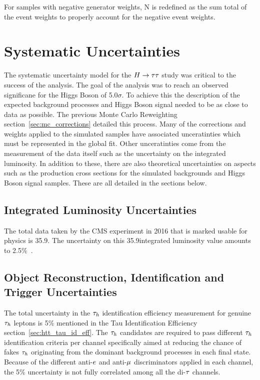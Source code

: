 For samples with negative generator weights, N is redefined as the sum total of the event weights to
properly account for the negative event weights.




\section{Systematic Uncertainties}
\label{sec:htt_systematics}

The systematic uncertainty model for the $H\to\tau\tau$ study was critical to the success of the analysis.
The goal of the analysis was to reach an observed significane for the Higgs Boson of 5.0$\sigma$.
To achieve this the description of the expected background processes and Higgs Boson signal
needed to be as close to data as possible. The previous Monte Carlo Reweighting 
section~\ref{sec:mc_corrections} detailed this process. Many of the corrections and weights applied
to the simulated samples have associated unceratinties which must be represented in the
global fit. Other unceratinties come from the measurement of the data itself such as the uncertainty
on the integrated luminosity. In addition to these, there are also theoretical uncertainties on
aspects such as the production cross sections for the simulated backgrounds and Higgs Boson signal
samples. These are all detailed in the sections below.


\subsection{Integrated Luminosity Uncertainties}
The total data taken by the CMS experiment in 2016 that is marked usable for physics is 35.9\fbinv. The uncertainty
on this 35.9\fbinv integrated luminosity value amounts to 2.5\%~\cite{CMS-PAS-LUM-17-001}.


\subsection{Object Reconstruction, Identification and Trigger Uncertainties}
The total uncertainty in the $\tau_{h}$ identification efficiency measurement for genuine $\tau_{h}$ leptons is 
5\% mentioned in the Tau Identification Efficiency section~\ref{sec:htt_tau_id_eff}.
The $\tau_{h}$ candidates are required to pass different $\tau_{h}$ identification criteria per channel
specifically aimed at reducing the chance of fakes $\tau_{h}$ originating from the dominant background
processes in each final state. Because of the different anti-$e$ and anti-$\mu$ discriminators
applied in each channel, the 5\% uncertainty is not fully correlated among all the di-$\tau$ channels.

